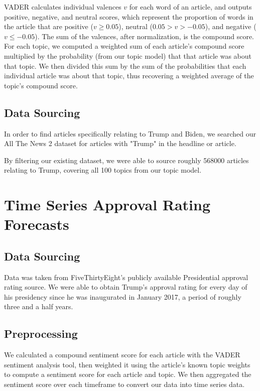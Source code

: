 \documentclass[12pt, letter-paper]{article}
\begin{document}
VADER calculates individual valences $v$ for each word of an article, and outputs positive, negative, and neutral scores, which represent the proportion of words in the article that are positive ($v \ge 0.05$), neutral ($0.05 > v > -0.05$), and negative ($v \le -0.05$). The sum of the valences, after normalization, is the compound score. For each topic, we computed a weighted sum of each article's compound score multiplied by the probability (from our topic model) that that article was about that topic. We then divided this sum by the sum of the probabilities that each individual article was about that topic, thus recovering a weighted average of the topic's compound score.

\subsection{Data Sourcing}

In order to find articles specifically relating to Trump and Biden, we searched our All The News 2 dataset for articles with "Trump" in the headline or article.

By filtering our existing dataset, we were able to source roughly 568000 articles relating to Trump, covering all 100 topics from our topic model.

\section{Time Series Approval Rating Forecasts}

\subsection{Data Sourcing}

Data was taken from FiveThirtyEight's publicly available Presidential approval rating source. We were able to obtain Trump's approval rating for every day of his presidency since he was inaugurated in January 2017, a period of roughly three and a half years. 

\subsection{Preprocessing}

We calculated a compound sentiment score for each article with the VADER sentiment analysis tool, then weighted it using the article's known topic weights to compute a sentiment score for each article and topic. We then aggregated the sentiment score over each timeframe to convert our data into time series data.
\end{document}
